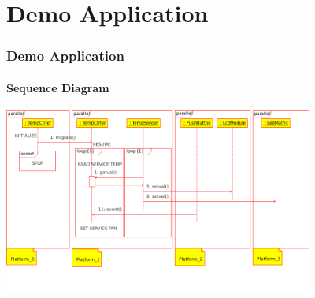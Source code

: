 \documentclass{beamer}
\theoremstyle{definition} \newtheorem{mdefinition}{Definition}
\theoremstyle{plain} \newtheorem{mtheorem}{Theorem}
\theoremstyle{plain} \newtheorem{mcorollary}{Corollary}
\theoremstyle{plain} \newtheorem{mfact}{Fact}
\begin{document}
\section{Demo Application}
\begin{frame}
  \frametitle{Demo Application}
  \framesubtitle{Sequence Diagram}
  \includegraphics[width=4in]{img/sequence-diagram-demoapp.png}
\end{frame}


\end{document}
